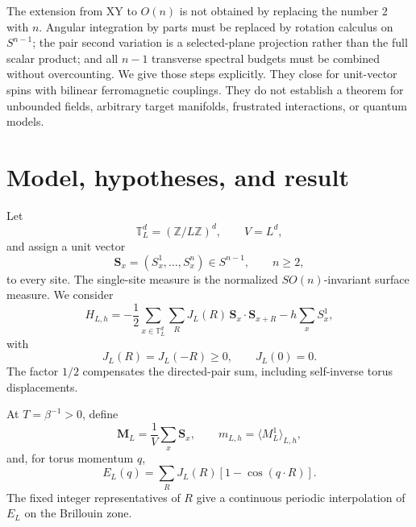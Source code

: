 \documentclass[aps,prb,twocolumn,groupedaddress,amsmath,amssymb,
               superscriptaddress,nofootinbib,floatfix]{revtex4-2}
\theoremstyle{plain}
\theoremstyle{definition}
\newcommand{\Torus}{\mathbb T}
\begin{document}
The extension from XY to $O(n)$ is not obtained by replacing the number
$2$ with $n$.  Angular integration by parts must be replaced by rotation
calculus on $S^{n-1}$; the pair second variation is a selected-plane
projection rather than the full scalar product; and all $n-1$ transverse
spectral budgets must be combined without overcounting.  We give those steps
explicitly.  They close for unit-vector spins with bilinear ferromagnetic
couplings.  They do not establish a theorem for unbounded fields, arbitrary
target manifolds, frustrated interactions, or quantum models.

\section{Model, hypotheses, and result}
\label{sec:model}

Let
\begin{equation}
 \Torus_L^d=(\mathbb Z/L\mathbb Z)^d,\qquad V=L^d,
\end{equation}
and assign a unit vector
\begin{equation}
 \bm S_x=(S_x^1,\ldots,S_x^n)\in S^{n-1},
 \qquad n\ge2,                                         \label{eq:hard-spin}
\end{equation}
to every site.  The single-site measure is the normalized
$SO(n)$-invariant surface measure.  We consider
\begin{equation}
 H_{L,h}
 =
 -\frac12\sum_{x\in\Torus_L^d}\sum_R
 J_L(R)\,\bm S_x\cdot\bm S_{x+R}
 -h\sum_xS_x^1,                                        \label{eq:H}
\end{equation}
with
\begin{equation}
 J_L(R)=J_L(-R)\ge0,\qquad J_L(0)=0.                   \label{eq:J-assumption}
\end{equation}
The factor $1/2$ compensates the directed-pair sum, including
self-inverse torus displacements.

At $T=\beta^{-1}>0$, define
\begin{equation}
 \bm M_L=\frac1V\sum_x\bm S_x,\qquad
 m_{L,h}=\langle M_L^1\rangle_{L,h},                   \label{eq:magnetizations}
\end{equation}
and, for torus momentum $q$,
\begin{equation}
 E_L(q)=\sum_RJ_L(R)[1-\cos(q\cdot R)].                \label{eq:E_L}
\end{equation}
The fixed integer representatives of $R$ give a continuous periodic
interpolation of $E_L$ on the Brillouin zone.
\end{document}
